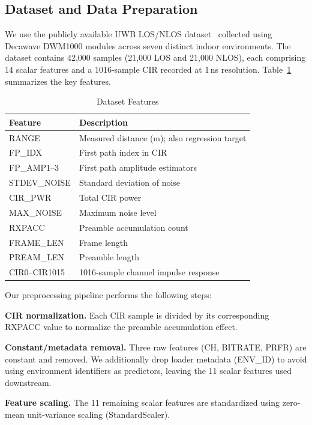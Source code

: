 \documentclass[conference]{IEEEtran}
\begin{document}
\subsection{Dataset and Data Preparation}

We use the publicly available UWB LOS/NLOS dataset~\cite{b7} collected using Decawave DWM1000 modules across seven distinct indoor environments. The dataset contains 42,000 samples (21,000 LOS and 21,000 NLOS), each comprising 14 scalar features and a 1016-sample CIR recorded at 1\,ns resolution. Table~\ref{tab:features} summarizes the key features.

\begin{table}[t]
\caption{Dataset Features}
\label{tab:features}
\centering
\begin{tabular}{@{}ll@{}}
\toprule
\textbf{Feature} & \textbf{Description} \\
\midrule
RANGE & Measured distance (m); also regression target \\
FP\_IDX & First path index in CIR \\
FP\_AMP1--3 & First path amplitude estimators \\
STDEV\_NOISE & Standard deviation of noise \\
CIR\_PWR & Total CIR power \\
MAX\_NOISE & Maximum noise level \\
RXPACC & Preamble accumulation count \\
FRAME\_LEN & Frame length \\
PREAM\_LEN & Preamble length \\
CIR0--CIR1015 & 1016-sample channel impulse response \\
\bottomrule
\end{tabular}
\end{table}

Our preprocessing pipeline performs the following steps:

\textbf{CIR normalization.} Each CIR sample is divided by its corresponding RXPACC value to normalize the preamble accumulation effect.

\textbf{Constant/metadata removal.} Three raw features (CH, BITRATE, PRFR) are constant and removed. We additionally drop loader metadata (ENV\_ID) to avoid using environment identifiers as predictors, leaving the 11 scalar features used downstream.

\textbf{Feature scaling.} The 11 remaining scalar features are standardized using zero-mean unit-variance scaling (StandardScaler).
\end{document}
